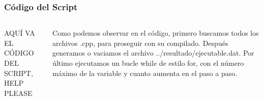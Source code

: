 \documentclass[compress]{beamer}
\begin{document}
\begin{frame}
\frametitle{Código del Script}
\begin{columns}
AQUÍ VA EL CÓDIGO DEL SCRIPT, HELP PLEASE

%
%

	Como podemos observar en el código, primero buscamos todos los archivos .cpp, para proseguir con su compilado. Después generamos o vaciamos el archivo ../resultado/ejecutable.dat. Por último ejecutamos un bucle while de estilo for, con el número máximo de la variable y cuanto aumenta en el paso a paso.
\end{columns}
\end{frame}
\end{document}
